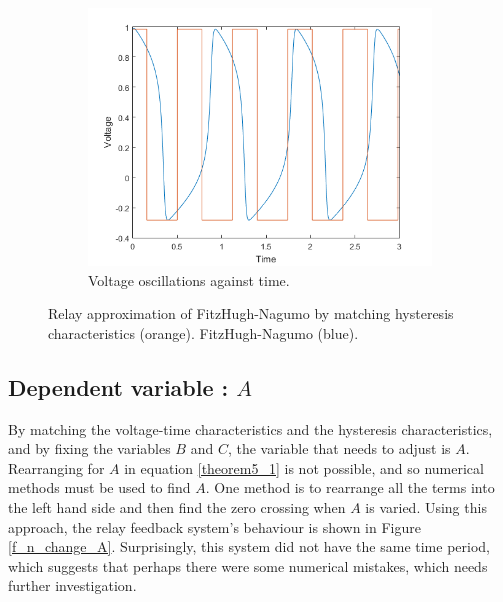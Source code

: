 \documentclass[a4paper]{article}
\begin{document}
\begin{figure}[h!]
\begin{subfigure}[t]{0.49\textwidth}
        \includegraphics[width=\textwidth]{fitz_relay_match_hysteresis_voltage_time}
        \caption{Voltage oscillations against time.}
        \label{fn_match_hysteresis_vt}
    \end{subfigure}
\caption{Relay approximation of FitzHugh-Nagumo by matching hysteresis characteristics (orange). FitzHugh-Nagumo (blue).}
\label{fn_match_hysteresis}
\end{figure}

\subsection{Dependent variable : $A$}
By matching the voltage-time characteristics and the hysteresis characteristics, and by fixing the variables $B$ and $C$, the variable that needs to adjust is $A$. Rearranging for $A$ in equation \ref{theorem5_1} is not possible, and so numerical methods must be used to find $A$. One method is to rearrange all the terms into the left hand side and then find the zero crossing when $A$ is varied. Using this approach, the relay feedback system's behaviour is shown in Figure \ref{f_n_change_A}. Surprisingly, this system did not have the same time period, which suggests that perhaps there were some numerical mistakes, which needs further investigation.
\end{document}
